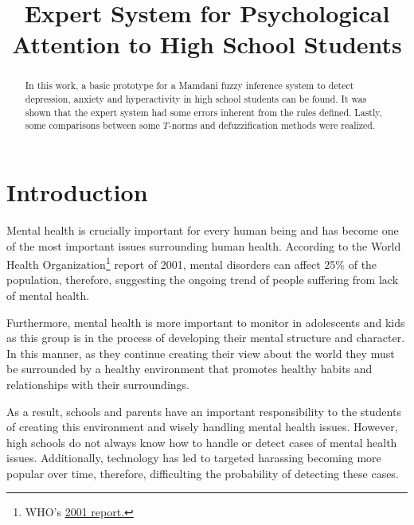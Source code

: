\documentclass[conference]{IEEEtran}
\theoremstyle{definition}
\theoremstyle{remark}
\theoremstyle{remark}
\begin{document}
\title{Expert System for Psychological Attention to High School Students}


\author{
  }

\maketitle

\begin{abstract}
  In this work, a basic prototype for a Mamdani fuzzy inference system to detect
  depression, anxiety and hyperactivity in high school students can be found. It
  was shown that the expert system had some errors inherent from the rules
  defined. Lastly, some comparisons between some $T$-norms and defuzzification
  methods were realized.
\end{abstract}



\section{Introduction}
Mental health is crucially important for every human being and has become one of
the most important issues surrounding human health. According to the World
Health Organization\footnote{WHO's \href{https://bit.ly/34l2v94}{2001 report.}}
report of 2001, mental disorders can affect 25\% of the population, therefore,
suggesting the ongoing trend of people suffering from lack of mental health.

Furthermore, mental health is more important to monitor in adolescents and kids
as this group is in the process of developing their mental structure and
character. In this manner, as they continue creating their view about the world
they must be surrounded by a healthy environment that promotes healthy habits
and relationships with their surroundings.

As a result, schools and parents have an important responsibility to the
students of creating this environment and wisely handling mental health issues.
However, high schools do not always know how to handle or detect cases of mental
health issues. Additionally, technology has led to targeted harassing becoming
more popular over time, therefore, difficulting the probability of detecting
these cases.
\end{document}
